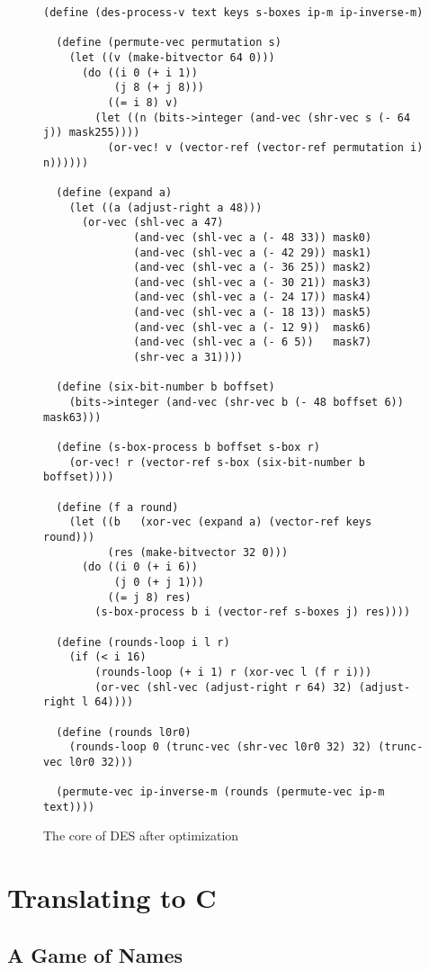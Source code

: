\begin{figure}[hbtp]
\begin{verbatim}
(define (des-process-v text keys s-boxes ip-m ip-inverse-m)

  (define (permute-vec permutation s)
    (let ((v (make-bitvector 64 0)))
      (do ((i 0 (+ i 1))
           (j 8 (+ j 8)))
          ((= i 8) v)
        (let ((n (bits->integer (and-vec (shr-vec s (- 64 j)) mask255))))
          (or-vec! v (vector-ref (vector-ref permutation i) n))))))

  (define (expand a)
    (let ((a (adjust-right a 48)))
      (or-vec (shl-vec a 47)
              (and-vec (shl-vec a (- 48 33)) mask0)
              (and-vec (shl-vec a (- 42 29)) mask1)
              (and-vec (shl-vec a (- 36 25)) mask2)
              (and-vec (shl-vec a (- 30 21)) mask3)
              (and-vec (shl-vec a (- 24 17)) mask4)
              (and-vec (shl-vec a (- 18 13)) mask5)
              (and-vec (shl-vec a (- 12 9))  mask6)
              (and-vec (shl-vec a (- 6 5))   mask7)
              (shr-vec a 31))))

  (define (six-bit-number b boffset)
    (bits->integer (and-vec (shr-vec b (- 48 boffset 6)) mask63)))

  (define (s-box-process b boffset s-box r)
    (or-vec! r (vector-ref s-box (six-bit-number b boffset))))

  (define (f a round)
    (let ((b   (xor-vec (expand a) (vector-ref keys round)))
          (res (make-bitvector 32 0)))
      (do ((i 0 (+ i 6))
           (j 0 (+ j 1)))
          ((= j 8) res)
        (s-box-process b i (vector-ref s-boxes j) res))))

  (define (rounds-loop i l r)
    (if (< i 16)
        (rounds-loop (+ i 1) r (xor-vec l (f r i)))
        (or-vec (shl-vec (adjust-right r 64) 32) (adjust-right l 64))))

  (define (rounds l0r0)
    (rounds-loop 0 (trunc-vec (shr-vec l0r0 32) 32) (trunc-vec l0r0 32)))

  (permute-vec ip-inverse-m (rounds (permute-vec ip-m text))))
\end{verbatim}
\caption{The core of DES after optimization}
\label{fig:after-opt}
\end{figure}


\section{Translating to C}
\label{sec:cimpl}

\subsection{A Game of Names}

